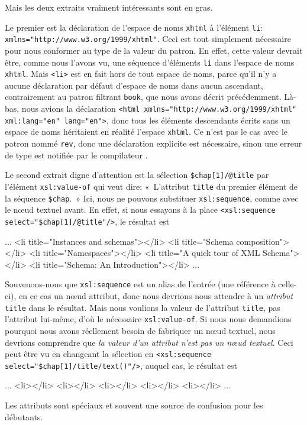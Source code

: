 Mais les deux extraits vraiment intéressants sont en gras.

Le premier est la déclaration de l'espace de noms \texttt{xhtml} à
l'élément \texttt{li}:
\texttt{xmlns="http://www.w3.org/1999/xhtml"}. Ceci est tout
simplement nécessaire pour nous conformer au type de la valeur du
patron. En effet, cette valeur devrait être, comme nous l'avons vu,
une séquence d'éléments \texttt{li} dans l'espace de noms
\texttt{xhtml}. Mais \texttt{<li>} est en fait hors de tout espace de
noms, parce qu'il n'y a aucune déclaration par défaut d'espace de noms
dans aucun ascendant, contrairement au patron filtrant \texttt{book},
que nous avons décrit précédemment. Là-bas, nous avions la déclaration
\texttt{<html xmlns="http://www.w3.org/1999/xhtml" xml:lang="en"
  lang="en">}, donc tous les éléments descendants écrits sans un
espace de noms héritaient en réalité l'espace \texttt{xhtml}. Ce n'est
pas le cas avec le patron nommé \texttt{rev}, donc une déclaration
explicite est nécessaire, sinon une erreur de type est notifiée par le
compilateur \XSLT.

Le second extrait digne d'attention est la sélection
\texttt{\$chap[1]/@title} par l'élément \texttt{xsl:value-of} qui veut
dire: «~L'attribut \texttt{title} du premier élément de la séquence
\texttt{\$chap}.~» Ici, nous ne pouvons substituer
\texttt{xsl:sequence}, comme avec le nœud textuel avant. En effet,
si nous essayons à la place \texttt{<xsl:sequence
  select="\$chap[1]/@title"/>}, le résultat est
\begin{sverb}
       ...
         <li title="Instances and schemas"></li>
         <li title="Schema composition"></li>
         <li title="Namespaces"></li>
         <li title="A quick tour of XML Schema"></li>
         <li title="Schema: An Introduction"></li>
       ...
\end{sverb}
Souvenons-nous que \texttt{xsl:sequence} est un alias de l'entrée (une
référence à celle-ci), en ce cas un nœud attribut, donc nous
devrions nous attendre à un \emph{attribut} \texttt{title} dans le
résultat. Mais nous voulions la valeur de l'attribut \texttt{title},
pas l'attribut lui-même, d'où le nécessaire \texttt{xsl:value-of}. Si
nous nous demandions pourquoi nous avons réellement besoin de
fabriquer un nœud textuel, nous devrions comprendre que \emph{la
  valeur d'un attribut n'est pas un nœud textuel}. Ceci peut être
vu en changeant la sélection en \texttt{<xsl:sequence
  select="\$chap[1]/title/text()"/>}, auquel cas, le résultat est
\begin{sverb}
       ...
         <li></li>
         <li></li>
         <li></li>
         <li></li>
         <li></li>
       ...
\end{sverb}
Les attributs sont spéciaux et souvent une source de confusion pour
les débutants.

